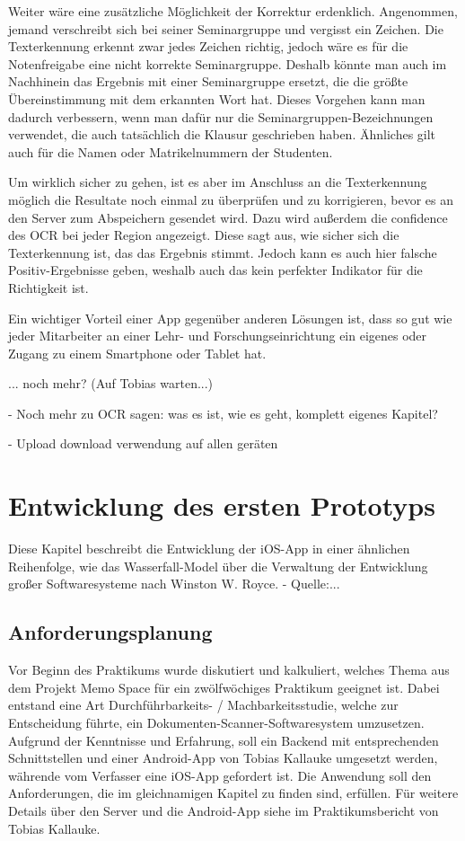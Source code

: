 \documentclass[nomenclature, onesided, 150]{HSMW-Thesis}
\begin{document}
	Weiter wäre eine zusätzliche Möglichkeit der Korrektur erdenklich. Angenommen, jemand verschreibt sich bei seiner Seminargruppe und vergisst ein Zeichen. Die Texterkennung erkennt zwar jedes Zeichen richtig, jedoch wäre es für die Notenfreigabe eine nicht korrekte Seminargruppe. Deshalb könnte man auch im Nachhinein das Ergebnis mit einer Seminargruppe ersetzt, die die größte Übereinstimmung mit dem erkannten Wort hat. Dieses Vorgehen kann man dadurch verbessern, wenn man dafür nur die Seminargruppen-Bezeichnungen verwendet, die auch tatsächlich die Klausur geschrieben haben. Ähnliches gilt auch für die Namen oder Matrikelnummern der Studenten.
	
	Um wirklich sicher zu gehen, ist es aber im Anschluss an die Texterkennung möglich die Resultate noch einmal zu überprüfen und zu korrigieren, bevor es an den Server zum Abspeichern gesendet wird. Dazu wird außerdem die confidence des OCR bei jeder Region angezeigt. Diese sagt aus, wie sicher sich die Texterkennung ist, das das Ergebnis stimmt. Jedoch kann es auch hier falsche Positiv-Ergebnisse geben, weshalb auch das kein perfekter Indikator für die Richtigkeit ist.
	
	Ein wichtiger Vorteil einer App gegenüber anderen Lösungen ist, dass so gut wie jeder Mitarbeiter an einer Lehr- und Forschungseinrichtung ein eigenes oder Zugang zu einem Smartphone oder Tablet hat.

		... noch mehr? (Auf Tobias warten...)
	
	- Noch mehr zu OCR sagen: was es ist, wie es geht, komplett eigenes Kapitel?

	- Upload download verwendung auf allen geräten



\chapter{Entwicklung des ersten Prototyps}
	Diese Kapitel beschreibt die Entwicklung der iOS-App in einer ähnlichen Reihenfolge, wie das Wasserfall-Model über die Verwaltung der Entwicklung großer Softwaresysteme nach Winston W. Royce. - Quelle:...
	
	\section{Anforderungsplanung}
	Vor Beginn des Praktikums wurde diskutiert und kalkuliert, welches Thema aus dem Projekt Memo Space für ein zwölfwöchiges Praktikum geeignet ist. Dabei entstand eine Art Durchführbarkeits- / Machbarkeitsstudie, welche zur Entscheidung führte, ein Dokumenten-Scanner-Softwaresystem umzusetzen. Aufgrund der Kenntnisse und Erfahrung, soll ein Backend mit entsprechenden Schnittstellen und einer Android-App von Tobias Kallauke umgesetzt werden, währende vom Verfasser eine iOS-App gefordert ist. Die Anwendung soll den Anforderungen, die im gleichnamigen Kapitel zu finden sind, erfüllen. Für weitere Details über den Server und die Android-App siehe im Praktikumsbericht von Tobias Kallauke.
\end{document}
